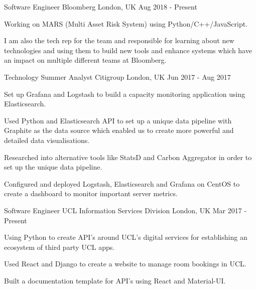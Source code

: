 

\begin{cventries}

\cventry
  {Software Engineer}
  {Bloomberg}
  {London, UK}
  {Aug 2018 - Present}
  {
  \begin{cvitems}
    \item {Working on MARS (Multi Asset Risk System) using Python/C++/JavaScript.}
    \item {I am also the tech rep for the team and responsible for learning about new technologies
      and using them to build new tools and enhance systems which have an impact on multiple different
      teams at Bloomberg.}
  \end{cvitems}
  }

\cventry
  {Technology Summer Analyst}
  {Citigroup}
  {London, UK}
  {Jun 2017 - Aug 2017}
  {
  \begin{cvitems}
    \item {Set up Grafana and Logstash to build a capacity monitoring application
      using Elasticsearch.}
    \item {Used Python and Elasticsearch API to set up a unique data pipeline
      with Graphite as the data source which enabled us to create more powerful
      and detailed data visualisations.}
    \item {Researched into alternative tools like StatsD and Carbon Aggregator
      in order to set up the unique data pipeline.}
    \item {Configured and deployed Logstash, Elasticsearch and Grafana on CentOS to create
      a dashboard to monitor important server metrics.}
  \end{cvitems}
  }


\cventry
  {Software Engineer}
  {UCL Information Services Division}
  {London, UK}
  {Mar 2017 - Present}
  {
  \begin{cvitems}
    \item {Using Python to create API's around UCL's digital services for establishing an ecosystem of third party UCL apps.}
    \item {Used React and Django to create a website to manage room bookings in UCL.}
    \item {Built a documentation template for API's using React and Material-UI.}
  \end{cvitems}
  }



\end{cventries}
